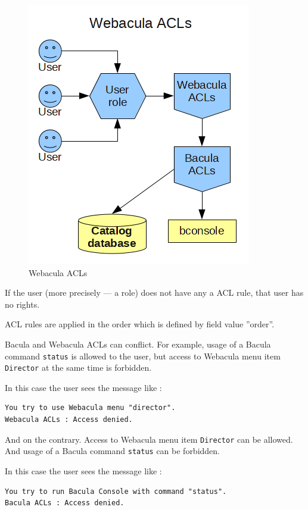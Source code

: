 \documentclass[10pt]{article}
\begin{document}
\begin{figure}[htp]
  \centering
  \includegraphics[totalheight=0.45\textheight,keepaspectratio=true]{./pics/ACLs.png}
  \caption[Webacula ACLs]{Webacula ACLs}
  \label{Webacula ACLs}
\end{figure}

If the user (more precisely --- a role) does not have any a ACL rule, that user has no rights.

ACL rules are applied in the order which is defined by field value ''order''.

Bacula and Webacula ACLs can conflict.
For example, usage of a Bacula command \texttt{status} is allowed to the user,
but access to Webacula menu item \texttt{Director} at the same time is forbidden.

In this case the user sees the message like :
\begin{verbatim}
You try to use Webacula menu "director".
Webacula ACLs : Access denied.
\end{verbatim}

And on the contrary.
Access to Webacula menu item \texttt{Director} can be allowed. And usage of a Bacula command \texttt{status} can be forbidden.

In this case the user sees the message like :
\begin{verbatim}
You try to run Bacula Console with command "status".
Bacula ACLs : Access denied.
\end{verbatim}
\end{document}
